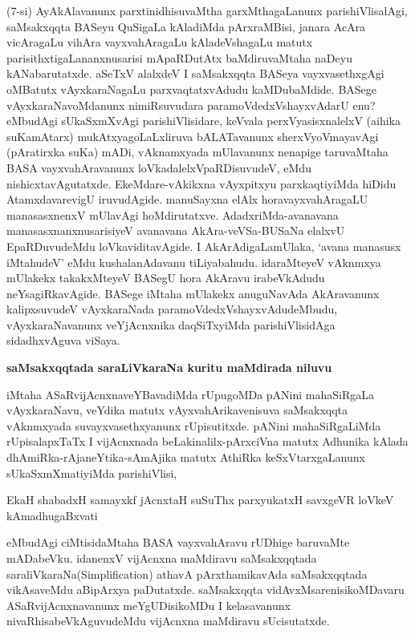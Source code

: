 \noindent
(7-si) AyAkAlavanunx parxtinidhisuvaMtha garxMthagaLanunx parishiVlisalAgi, saMsakxqqta BASeyu QuSigaLa kAladiMda pArxraMBisi, janara AcAra vicAragaLu vihAra vayxva\-hAragaLu kAladeVshagaLu matutx parisithxtigaLa\-nanxnusarisi mApaRDutAtx baMdiru\break\-vaMtaha naDeyu kANabarutatxde. aSeTxV alalxdeV I saMsakxqqta BASeya vayxvasethx\-gAgi oMBatutx vAyxkaraNagaLu parxvaqtatxvAdudu kaMDubaMdide. BASege vAyxkaraNa\-voMdanunx nimiRsu\-vudara paramoVdedxVshayxvAdarU enu? eMbudAgi 
sUkaSxmXvAgi pari\-shiVli\-sidare, keVvala perxVyasisxnalelxV (aihika suKamAtarx) mukAtxyagoLaLxliruva bALATa\-vanunx sherxVyoVmayavAgi (pAratirxka suKa) mADi, vAknamxyada mUlavanunx nena\-pige taruvaMtaha BASA vayxvahAravanunx loVkadalelxVpaRDisuvudeV, eMdu nishicxta\-vAgutatxde. EkeMdare-vAkikxna vAyxpitxyu parxkaqtiyiMda hiDidu AtamxdavarevigU iruvudAgide. manuSayxna elAlx horavayxvahAragaLU manasasxnenxV mUlavAgi hoMdi\-rutatxve. AdadxriMda-avanavana manasasxnanxnusarisiyeV avanavana AkAra-veVSa-\break\-BUSaNa elalxvU EpaRDuvudeMdu loVkaviditavAgide. I AkArAdigaLa\break mUlaka, `avana manasusx iMtahudeV' eMdu kushalanAdavanu tiLiyabahudu. ida\-raMteyeV vAknmxya mUlakekx takakxMteyeV BASegU hora AkAravu ira\-beVkA\-dudu neYsagiRkavAgide. BASege iMtaha mUlakekx anuguNavAda AkAravanunx kalipxsuvudeV vAyxkaraNada paramoVdedxVshayxvAdudeMbudu, vAyxkaraNavanunx veYjAcnxnika daqSiTxyiMda parishiVlisidAga sidadhxvAguva viSaya.

{\bigskip
\noindent
{\large\bf saMsakxqqtada saraLiVkaraNa kuritu maMdirada niluvu}}\label{page33}
\medskip

\noindent
iMtaha ASaRvijAcnxnaveYBavadiMda rUpugoMDa pANini mahaSiRgaLa vAyxkaraNavu, veYdika matutx vAyxva\-hArikavenisuva saMsakxqqta vAknmxyada suvayxvasethxyanunx rUpisu\-titxde. pANini mahaSiRgaLiMda rUpisa\-lapxTaTx I vijAcnxnada beLakinalilx-pArxciVna matutx Adhunika kAlada dhAmiRka-rAjaneYtika-sAmAjika matutx AthiRka keSxVtarxgaLanunx sUkaSxmXmatiyiMda parishiVlisi,

\begin{shloka}
EkaH shabadxH samayxkf jAcnxtaH suSuThx parxyukatxH savxgeVR loVkeV kAmadhugaBxvati\label{35}
\end{shloka}

eMbudAgi ciMtisidaMtaha BASA vayxvahAravu rUDhige baruvaMte mADa\-beVku. idanenxV vijAcnxna maMdiravu saMsakxqqtada saraliVkaraNa{(\rm Simplification)} athavA pArxthamikavAda saMsakxqqtada vikAsaveMdu aBipArxya paDutatxde. saMsakxqqta vidAvxMsarenisikoMDavaru ASaRvijAcnxnavanunx meYgUDisikoMDu I kelasa\-vanunx nivaRhisabeVkAguvudeMdu vijAcnxna maMdiravu sUcisutatxde.

